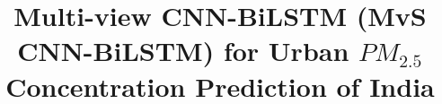 \documentclass[a4paper,fleqn]{cas-sc}
\begin{document}
\let\WriteBookmarks\relax
\def\floatpagepagefraction{1}
\def\textpagefraction{.001}



\title [mode = title]{Multi-view CNN-BiLSTM (MvS CNN-BiLSTM) for Urban $PM_{2.5}$ Concentration Prediction of India}  

\end{document}
